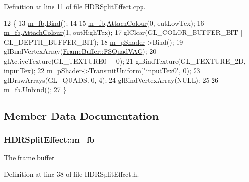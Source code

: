 Definition at line 11 of file H\+D\+R\+Split\+Effect.\+cpp.


\begin{DoxyCode}
12 \{
13   \hyperlink{class_h_d_r_split_effect_a3bfac50a5086d2b5c8dda9b4f41e5bcb}{m\_fb}.\hyperlink{class_frame_buffer_ae7e61568475fba3b15e446c9061833ea}{Bind}();
14 
15   \hyperlink{class_h_d_r_split_effect_a3bfac50a5086d2b5c8dda9b4f41e5bcb}{m\_fb}.\hyperlink{class_frame_buffer_a1556417c0dec00d1d24bdf0e84bc4c4d}{AttachColour}(0, outLowTex);
16   \hyperlink{class_h_d_r_split_effect_a3bfac50a5086d2b5c8dda9b4f41e5bcb}{m\_fb}.\hyperlink{class_frame_buffer_a1556417c0dec00d1d24bdf0e84bc4c4d}{AttachColour}(1, outHighTex);
17   glClear(GL\_COLOR\_BUFFER\_BIT | GL\_DEPTH\_BUFFER\_BIT);
18   \hyperlink{class_h_d_r_split_effect_a9287e35ef3eb82b745d8474e455913d0}{m\_pShader}->Bind();
19   glBindVertexArray(\hyperlink{class_frame_buffer_a22b0c9de2bef06e0de865684556a6677}{FrameBuffer::FSQuadVAO});
20   glActiveTexture(GL\_TEXTURE0 + 0);
21   glBindTexture(GL\_TEXTURE\_2D, inputTex);
22   \hyperlink{class_h_d_r_split_effect_a9287e35ef3eb82b745d8474e455913d0}{m\_pShader}->TransmitUniform(\textcolor{stringliteral}{"inputTex0"}, 0);
23   glDrawArrays(GL\_QUADS, 0, 4);
24   glBindVertexArray(NULL);
25 
26   \hyperlink{class_h_d_r_split_effect_a3bfac50a5086d2b5c8dda9b4f41e5bcb}{m\_fb}.\hyperlink{class_frame_buffer_a1e114b325998ec4e4b9a9ea090d64ae8}{Unbind}();
27 \}
\end{DoxyCode}


\subsection{Member Data Documentation}
\subsubsection[{\texorpdfstring{m\+\_\+fb}{m_fb}}]{ H\+D\+R\+Split\+Effect\+::m\+\_\+fb\hspace{0.3cm}{\ttfamily [private]}}\hypertarget{class_h_d_r_split_effect_a3bfac50a5086d2b5c8dda9b4f41e5bcb}{}\label{class_h_d_r_split_effect_a3bfac50a5086d2b5c8dda9b4f41e5bcb}


The frame buffer 



Definition at line 38 of file H\+D\+R\+Split\+Effect.\+h.

